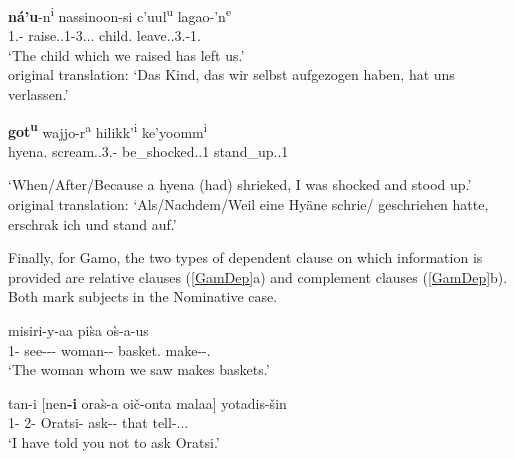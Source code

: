 \begin{exe}\ex\label{KabDep}
\begin{xlist}
\ex\gll \textbf{n\'a'u}-n\textsuperscript{i} nassinoon-si c'uul\textsuperscript{u} lagao-'n\textsuperscript{e}\\
1\pl{}.\nom{}-\emphat{} raise.\pfv{}.1\pl{}-3\sg{}.\mas{}.\obj{}.\relativ{} child.\nom{} leave.\pfv{}.3\sg{}.\mas{}-1\pl{}.\obj{}\\
\glt `The child which we raised has left us.'\\
original translation: `Das Kind, das wir selbst aufgezogen haben, hat uns verlassen.' %

\ex\gll \textbf{got\textsuperscript{u}} wajjo-r\textsuperscript{a} hilikk'\textsuperscript{i} ke'yoomm\textsuperscript{i}\\
hyena.\nom{} scream.\pfv{}.3\sg{}.\mas{}-\tmp{} be\_shocked.\cvb{}.1\sg{} stand\_up.\pfv{}.1\sg{}\\
\begin{sloppypar}\glt  `When/After/Because a hyena (had) shrieked, I was shocked and stood up.' %
\\
\glt original translation: `Als/Nachdem/Weil eine Hy\"{a}ne schrie/ ge\-schrie\-hen hatte, erschrak ich und stand auf.' \end{sloppypar} %
\end{xlist}
\end{exe}

Finally, for Gamo, the two types of dependent clause on which information is provided are relative clauses (\ref{GamDep}a) and complement clauses (\ref{GamDep}b). 
Both mark subjects in the Nominative  case.

\pagebreak
\begin{exe}\ex\label{GamDep}
\begin{xlist}
\ex{} misiri-y-aa pi\`sa o\`s-a-us\\
1\pl{}-\nom{} see-\persm-\tns{}-\complx{} woman--\nom{} basket.\acc{} make-\persm-\tns{}.\complx{}\\
\glt `The woman whom we saw makes baskets.'

\ex\gll tan-i [nen\textbf{-i} ora\`s-a oi\v c-onta malaa] yotadis-\v sin\\
1\sg{}-\nom{} 2\sg{}-\nom{} Oratsi-\acc{} ask-\Neg{}-\Inf{} that tell-\persm.\tns{}.\complx{}.\aux{}\\
\glt `I have told you not to ask Oratsi.'
\end{xlist}
\end{exe}


